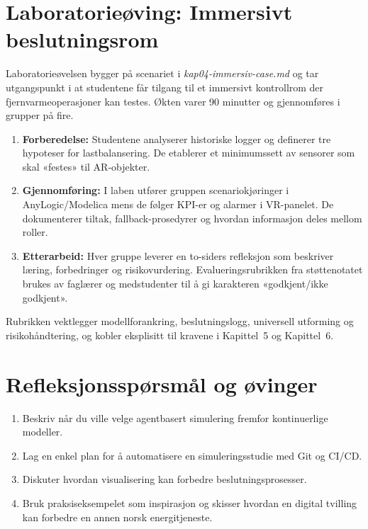 \section{Laboratorieøving: Immersivt beslutningsrom}
Laboratorieøvelsen bygger på scenariet i \textit{kap04-immersiv-case.md} og tar utgangspunkt i at studentene får tilgang til et immersivt kontrollrom der fjernvarmeoperasjoner kan testes. Økten varer 90 minutter og gjennomføres i grupper på fire.

\begin{enumerate}
    \item \textbf{Forberedelse:} Studentene analyserer historiske logger og definerer tre hypoteser for lastbalansering. De etablerer et minimumssett av sensorer som skal «festes» til AR-objekter.
    \item \textbf{Gjennomføring:} I laben utfører gruppen scenariokjøringer i AnyLogic/Modelica mens de følger KPI-er og alarmer i VR-panelet. De dokumenterer tiltak, fallback-prosedyrer og hvordan informasjon deles mellom roller.
    \item \textbf{Etterarbeid:} Hver gruppe leverer en to-siders refleksjon som beskriver læring, forbedringer og risikovurdering. Evalueringsrubrikken fra støttenotatet brukes av faglærer og medstudenter til å gi karakteren «godkjent/ikke godkjent».
\end{enumerate}

Rubrikken vektlegger modellforankring, beslutningslogg, universell utforming og risikohåndtering, og kobler eksplisitt til kravene i Kapittel~5 og Kapittel~6.

\section{Refleksjonsspørsmål og øvinger}
\begin{enumerate}
    \item Beskriv når du ville velge agentbasert simulering fremfor kontinuerlige modeller.
    \item Lag en enkel plan for å automatisere en simuleringsstudie med Git og CI/CD.
    \item Diskuter hvordan visualisering kan forbedre beslutningsprosesser.
    \item Bruk praksiseksempelet som inspirasjon og skisser hvordan en digital tvilling kan forbedre en annen norsk energitjeneste.
\end{enumerate}
